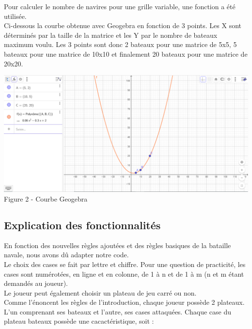 \documentclass[a4paper,12pt]{article}
\begin{document}
     \newpage
     Pour calculer le nombre de navires pour une grille variable, une fonction a été utilisée.\\
      Ci-dessous la courbe obtenue avec Geogebra en fonction de 3 points. Les X sont déterminés par la taille de la matrice et les Y par le nombre de bateaux maximum voulu. Les 3 points sont donc 2 bateaux pour une matrice de 5x5, 5 bateaux pour une matrice de 10x10 et finalement 20 bateaux pour une matrice de 20x20. \\
      \begin{center}
         \includegraphics[width=1\textwidth] {courbe.png}
         Figure 2 - Courbe Geogebra
      \end{center}
      \newpage
\subsection {Explication des fonctionnalités}
        En fonction des nouvelles règles ajoutées et des règles basiques de la bataille navale, nous avons dû adapter notre code.
    \vspace{2\baselineskip}\\
    Le choix des cases se fait par lettre et chiffre. Pour une question de practicité, les cases sont numérotées, en ligne et en colonne, de 1 à n et de 1 à m (n et m étant demandés au joueur).\\
                Le joueur peut également choisir un plateau de jeu carré ou non. 
                \vspace{2\baselineskip}\\
                Comme l'énoncent les règles de l'introduction, chaque joueur possède 2 plateaux. L'un comprenant ses bateaux et l'autre, ses cases attaquées. 
                    Chaque case du plateau bateaux possède une cacactéristique, soit :
                    
\end{document}
